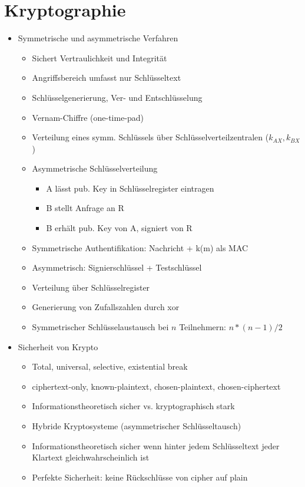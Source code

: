\documentclass[11pt, paper=a4, twocolumn]{scrartcl}
\begin{document}
\section{Kryptographie}
	\begin{itemize}
		\item Symmetrische und asymmetrische Verfahren
			\begin{itemize}
				\item Sichert Vertraulichkeit und Integrität
				\item Angriffsbereich umfasst nur Schlüsseltext
				\item Schlüsselgenerierung, Ver- und Entschlüsselung
				\item Vernam-Chiffre (one-time-pad)
				\item Verteilung eines symm. Schlüssels über 
					Schlüsselverteilzentralen ($k_{AX},k_{BX}$)
				\item Asymmetrische Schlüsselverteilung
					\begin{itemize}
						\item A lässt pub. Key in 
							Schlüsselregister eintragen
						\item B stellt Anfrage an R
						\item B erhält pub. Key von A, signiert 
							von R
					\end{itemize}
				\item Symmetrische Authentifikation: Nachricht + k(m) als 
					MAC
				\item Asymmetrisch: Signierschlüssel + Testschlüssel
				\item Verteilung über Schlüsselregister
				\item Generierung von Zufallszahlen durch xor
				\item Symmetrischer Schlüsselaustausch bei $n$ 
					Teilnehmern: $n*(n-1)/2$
			\end{itemize}

		\item Sicherheit von Krypto
			\begin{itemize}
				\item Total, universal, selective, existential break
				\item ciphertext-only, known-plaintext, chosen-plaintext, 
					chosen-ciphertext
				\item Informationstheoretisch sicher vs. kryptographisch 
					stark
				\item Hybride Kryptosysteme (asymmetrischer 
					Schlüsseltausch)
				\item Informationstheoretisch sicher wenn hinter jedem 
					Schlüsseltext jeder Klartext gleichwahrscheinlich 
					ist
				\item Perfekte Sicherheit: keine Rückschlüsse von cipher 
					auf plain
			\end{itemize}


\end{itemize}
\end{document}
